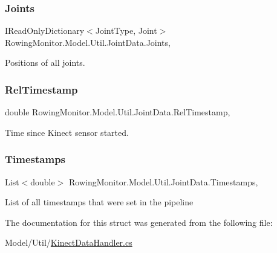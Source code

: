 \subsubsection{\texorpdfstring{Joints}{Joints}}
{\footnotesize\ttfamily I\+Read\+Only\+Dictionary$<$Joint\+Type, Joint$>$ Rowing\+Monitor.\+Model.\+Util.\+Joint\+Data.\+Joints\hspace{0.3cm}{\ttfamily [get]}, {\ttfamily [set]}}



Positions of all joints. 

\mbox{\label{struct_rowing_monitor_1_1_model_1_1_util_1_1_joint_data_a56463d7bd16c6e5cad4e3619e9df9508}} 
\subsubsection{\texorpdfstring{Rel\+Timestamp}{RelTimestamp}}
{\footnotesize\ttfamily double Rowing\+Monitor.\+Model.\+Util.\+Joint\+Data.\+Rel\+Timestamp\hspace{0.3cm}{\ttfamily [get]}, {\ttfamily [set]}}



Time since Kinect sensor started. 

\mbox{\label{struct_rowing_monitor_1_1_model_1_1_util_1_1_joint_data_a98bf571ea92c7f9b8e197062f17ddc27}} 
\subsubsection{\texorpdfstring{Timestamps}{Timestamps}}
{\footnotesize\ttfamily List$<$double$>$ Rowing\+Monitor.\+Model.\+Util.\+Joint\+Data.\+Timestamps\hspace{0.3cm}{\ttfamily [get]}, {\ttfamily [set]}}



List of all timestamps that were set in the pipeline 



The documentation for this struct was generated from the following file\+:\begin{DoxyCompactItemize}
\item 
Model/\+Util/\hyperlink{_kinect_data_handler_8cs}{Kinect\+Data\+Handler.\+cs}\end{DoxyCompactItemize}
